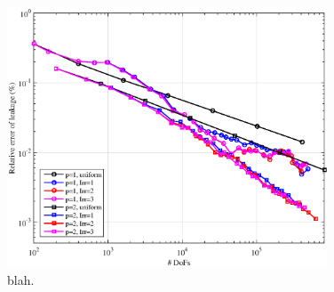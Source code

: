 \begin{figure}
\centering
\includegraphics[width=0.85\textwidth]{figures/sec_BF/SL_MAXENT_Err.eps}
\caption{blah.}
\label{fig::BF_Results_SL_MAXENT_err}
\end{figure}

